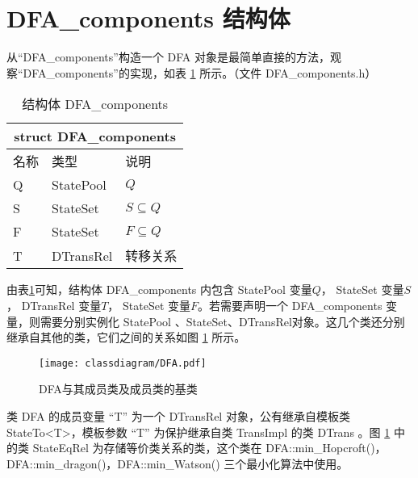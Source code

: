 \newpage
\section{DFA\_components 结构体}\label{sc:dfa_com}%

从“DFA\_components”构造一个 DFA 对象是最简单直接的方法，观察“DFA\_components”的实现，如表 \ref{tab:DFA-components} 所示。（文件 DFA\_components.h）
\begin{table}[!htbp]
    \caption{结构体 DFA\_components}
    \label{tab:DFA-components}
    \centering
    \small%
    \setlength{\tabcolsep}{4pt}%
    \renewcommand{\arraystretch}{1.2}%
        \begin{tabular}{p{3em}<{\centering} p{5em}<{\raggedright} p{5em}<{\raggedright}} %
        \toprule 
         \multicolumn{3}{c}{struct DFA\_components} \\
        \midrule
        名称& 类型 & \mbox{说明} \\
        \midrule
        Q & StatePool &      $Q$     \\
        S & StateSet  &  $S\subseteq Q$ \\
        F & StateSet  &  $F\subseteq Q$ \\
        T & DTransRel &  转移关系  \\
        \bottomrule
    \end{tabular}
\end{table}

由表\ref{tab:DFA-components}可知，结构体 DFA\_components 内包含 StatePool 变量$Q$， StateSet 变量$S$， DTransRel 变量$T$， StateSet 变量$F$。若需要声明一个 DFA\_components 变量，则需要分别实例化 StatePool 、StateSet、DTransRel对象。这几个类还分别继承自其他的类，它们之间的关系如图 \ref{fig:DFARel} 所示。

\begin{figure}[!htbp]
    \centering
    \texttt{[image: classdiagram/DFA.pdf]}
    \caption{DFA与其成员类及成员类的基类}
    \label{fig:DFARel}
\end{figure}

类 DFA 的成员变量 “T” 为一个 DTransRel 对象，公有继承自模板类 StateTo<T>，模板参数 “T” 为保护继承自类 TransImpl 的类 DTrans 。图 \ref{fig:DFARel} 中的类 StateEqRel 为存储等价类关系的类，这个类在 DFA::min\_Hopcroft()，DFA::min\_dragon()，DFA::min\_Watson() 三个最小化算法中使用。

